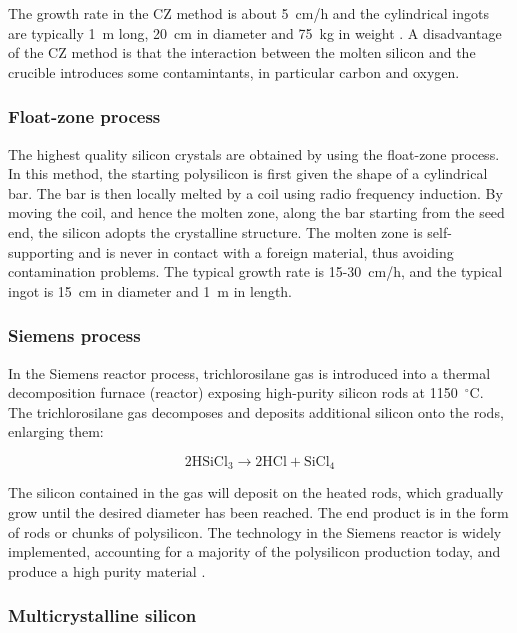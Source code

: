The growth rate in the CZ method is about 5~cm/h and the cylindrical ingots are typically 1~m long, 20~cm in diameter and 75~kg in weight \cite{solar_cells}. A disadvantage of the CZ method is that the interaction between the molten silicon and the crucible introduces some contamintants, in particular carbon and oxygen. 

\subsubsection{Float-zone process}

The highest quality silicon crystals are obtained by using the float-zone process. In this method, the starting polysilicon is first given the shape of a cylindrical bar. The bar is then locally melted by a coil using radio frequency induction. By moving the coil, and hence the molten zone, along the bar starting from the seed end, the silicon adopts the crystalline structure. The molten zone is self-supporting and is never in contact with a foreign material, thus avoiding contamination problems. The typical growth rate is 15-30~cm/h, and the typical ingot is 15~cm in diameter and 1~m in length.

\subsubsection{Siemens process}

In the Siemens reactor process, trichlorosilane gas is introduced into a thermal decomposition furnace (reactor) exposing high-purity silicon rods at 1150~$^\circ$C. The trichlorosilane gas decomposes and deposits additional silicon onto the rods, enlarging them:

\begin{equation}
2 \text{HSiCl}_3 \rightarrow 2 \text{HCl} + \text{SiCl}_4
\label{eq:siemens}
\end{equation}

The silicon contained in the gas will deposit on the heated rods, which gradually grow until the desired diameter has been reached. The end product is in the form of rods or chunks of polysilicon. The technology in the Siemens reactor is widely implemented, accounting for a majority of the polysilicon production today, and produce a high purity material \cite{pv_handbook}.


\subsubsection{Multicrystalline silicon}

